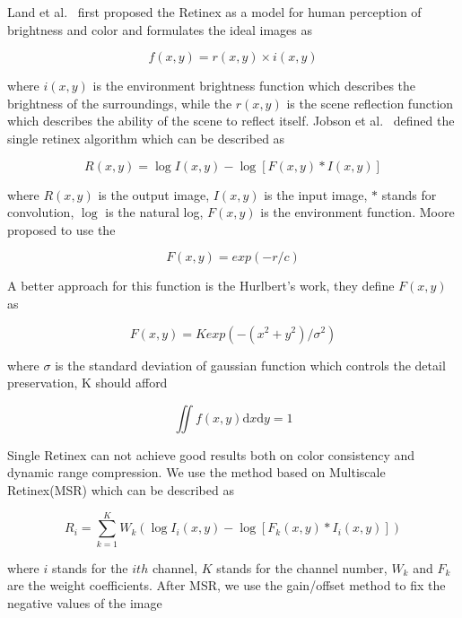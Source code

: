 Land et al.~\cite{Land_Retinex} first proposed the Retinex as a model
for human perception of brightness and color and formulates the ideal
images as

\begin{equation}\label{retinex}
f(x,y)=r(x,y)\times i(x,y)
\end{equation}

where $i(x,y)$ is the environment brightness function which describes
the brightness of the surroundings, while the $r(x,y)$ is the scene
reflection function which describes the ability of the scene to
reflect itself. Jobson et al.~\cite{JOBSON_Retinex} defined the single
retinex algorithm which can be described as

\begin{equation}
R(x,y) = \log I(x,y)- \log [F(x,y) \ast I(x,y)]
\end{equation}

where $R(x,y)$ is the output image, $I(x,y)$ is the input image,
$\ast$ stands for convolution, $\log$ is the natural log, $F(x,y)$ is
the environment function. Moore \cite{MOORE_Retinex} proposed to use
the

\begin{equation}
F(x,y)=exp(-r/c)
\end{equation}

A better approach for this function is the Hurlbert's \cite{lighting_equotion}
work, they define $F(x,y)$ as

\begin{equation}
F(x,y) = Kexp(-(x^2+y^2)/\sigma^2)
\end{equation}

where $\sigma$ is the standard deviation of gaussian function which
controls the detail preservation, K should afford

\begin{equation}
\iint f(x,y)\mathrm{d}x\mathrm{d}y = 1
\end{equation}

Single Retinex can not achieve good results both on color consistency
and dynamic range compression. We use the method based on Multiscale Retinex(MSR)
which can be described as

\begin{equation}
R_{i} = \sum_{k=1}^{K} W_{k}(\log I_{i}(x,y) - \log[F_{k}(x,y) \ast I_{i}(x,y)])
\end{equation}

where $i$ stands for the $ith$ channel, $K$ stands for the channel
number, $W_{k}$ and $F_{k}$ are the weight coefficients. After MSR, we
use the gain/offset method to fix the negative values of the image

